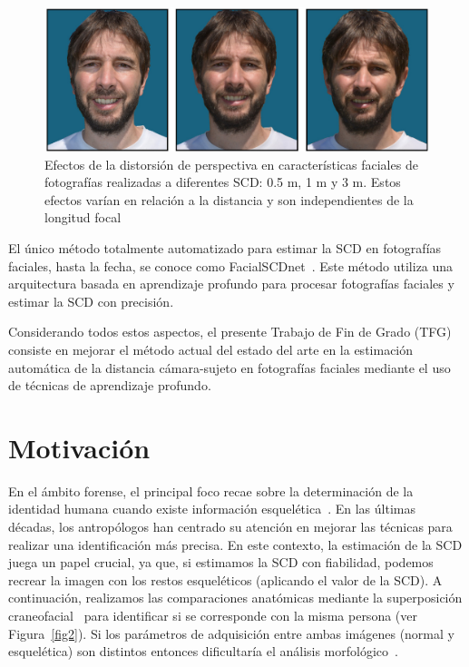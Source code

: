 \begin{figure}[h]
	\centering
	\includegraphics[scale=0.25]{imagenes/cap1/facial_distortion.png}
	\caption{Efectos de la distorsión de perspectiva en características faciales de fotografías realizadas a diferentes SCD: 0.5 m, 1 m y 3 m. Estos efectos varían en relación a la distancia y son independientes de la longitud focal~\cite{14}}
	\label{fig1}
\end{figure}



El único método totalmente automatizado para estimar la SCD en fotografías faciales, hasta la fecha, se conoce como FacialSCDnet~\cite{14}. Este método utiliza una arquitectura basada en aprendizaje profundo para procesar fotografías faciales y estimar la SCD con precisión.



Considerando todos estos aspectos, el presente Trabajo de Fin de Grado (TFG) consiste en mejorar el método actual del estado del arte en la estimación automática de la distancia cámara-sujeto en fotografías faciales mediante el uso de técnicas de aprendizaje profundo.


\section{Motivación}
En el ámbito forense, el principal foco recae sobre la determinación de la identidad humana cuando existe información esquelética~\cite{22}. En las últimas décadas, los antropólogos han centrado su atención en mejorar las técnicas para realizar una identificación más precisa. En este contexto, la estimación de la SCD juega un papel crucial, ya que, si estimamos la SCD con fiabilidad, podemos recrear la imagen con los restos esqueléticos (aplicando el valor de la SCD). A continuación, realizamos las comparaciones anatómicas mediante la superposición craneofacial~\cite{21} para identificar si se corresponde con la misma persona (ver Figura~\ref{fig2}). Si los parámetros de adquisición entre ambas imágenes (normal y esquelética) son distintos entonces dificultaría el análisis morfológico~\cite{23}.

